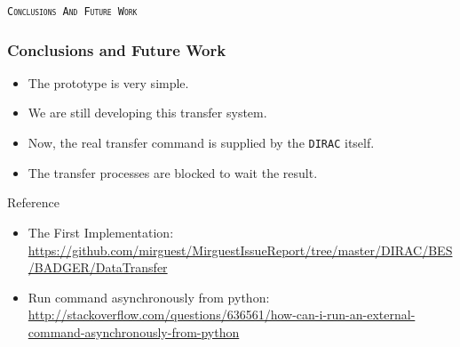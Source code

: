 \begin{frame}
    \begin{center}
        \LARGE \tt{{\textsc{Conclusions And Future Work}}}
    \end{center}
\end{frame}

\begin{frame}
    \frametitle{Conclusions and Future Work}
    \begin{itemize}
        \item The prototype is very simple.
        \item We are still developing this transfer system.
        \item Now, the real transfer command is supplied by the 
              {\tt DIRAC} itself. 
        \item The transfer processes are blocked to wait the 
              result.
    \end{itemize}
    \begin{block}{Reference}
        \begin{itemize}
            \item The First Implementation: 
                {\footnotesize\url{https://github.com/mirguest/MirguestIssueReport/tree/master/DIRAC/BES/BADGER/DataTransfer}}
            \item Run command asynchronously from python:
                {\footnotesize\url{http://stackoverflow.com/questions/636561/how-can-i-run-an-external-command-asynchronously-from-python}}
        \end{itemize}
    \end{block}
\end{frame}

